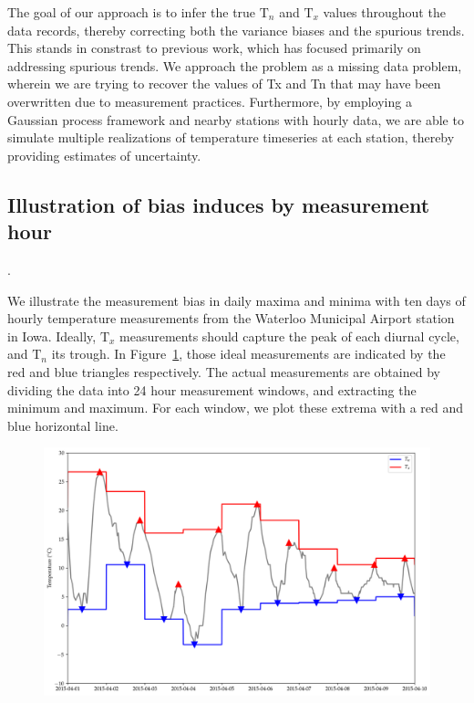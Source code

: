 \documentclass[letter]{article}
\makeatletter
\def\maxwidth{\ifdim\Gin@nat@width>\linewidth\linewidth
\else\Gin@nat@width\fi}
\let\Oldincludegraphics\includegraphics
\renewcommand{\includegraphics}[1]{\Oldincludegraphics[width=.8\maxwidth]{#1}}
\newcommand{\T}{\mathrm{T}}
\newcommand{\Tn}{\T_{n}}
\newcommand{\Tx}{\T_{x}}
\renewcommand{\cite}[1]{\citep{#1}}
\makeatother
\begin{document}
The goal of our approach is to infer the true $\Tn$ and $\Tx$ values throughout the data records, thereby correcting both the variance biases and the spurious trends. This stands in constrast to previous work, which has focused primarily on addressing spurious trends. We approach the problem as a missing data problem, wherein we are trying to recover the values of Tx and Tn that may have been overwritten due to measurement practices. Furthermore, by employing a Gaussian process framework and nearby stations with hourly data, we are able to simulate multiple realizations of temperature timeseries at each station, thereby providing estimates of uncertainty.
        \subsection{Illustration of bias induces by measurement hour}\label{illustration-of-bias-induces-by-measurement-hour}
    


        \cite{baker1975effect}.
    


        We illustrate the measurement bias in daily maxima and minima with ten days of hourly temperature measurements from the Waterloo Municipal Airport station in Iowa.
Ideally, \(\Tx\) measurements should capture the peak of each diurnal cycle, and \(\Tn\) its trough.
In Figure~\ref{fig:waterloo_triangles}, those ideal measurements are indicated by the red and blue triangles respectively.
The actual measurements are obtained by dividing the data into 24 hour measurement windows, and extracting the minimum and maximum.
For each window, we plot these extrema with a red and blue horizontal line.

\begin{figure}
\centering
\includegraphics{figures/waterloo_triangles.png}
\caption{\label{fig:waterloo_triangles}}
\end{figure}
\end{document}
